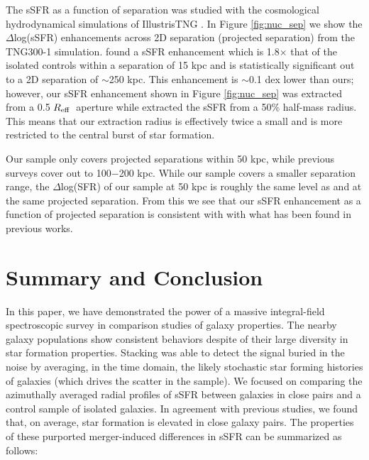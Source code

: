 \documentclass[iop,revtex4,twocolumn,apj,numberedappendix,appendixfloats]{emulateapj}
\newcommand{\reff}{$R_{\rm eff}$}
\begin{document}
The sSFR as a function of separation was studied with the cosmological hydrodynamical simulations of IllustrisTNG \citep{Patton:2020}. In Figure \ref{fig:nuc_sep} we show the $\Delta$log(sSFR) enhancements across 2D separation (projected separation) from the TNG300-1 simulation. \citet{Patton:2020} found a sSFR enhancement which is 1.8$\times$ that of the isolated controls within a separation of 15 kpc and is statistically significant out to a 2D separation of $\sim$250 kpc. This enhancement is $\sim$0.1 dex lower than ours; however, our sSFR enhancement shown in Figure \ref{fig:nuc_sep} was extracted from a 0.5 \reff\ aperture while \citet{Patton:2020} extracted the sSFR from a 50\% half-mass radius. This means that our extraction radius is effectively twice a small and is more restricted to the central burst of star formation. 

Our sample only covers projected separations within 50 kpc, while previous surveys cover out to 100$-$200 kpc. While our sample covers a smaller separation range, the $\Delta$log(SFR) of our sample at 50 kpc is roughly the same level as \citet{Scudder:2012} and \citet{Patton:2013} at the same projected separation. From this we see that our sSFR enhancement as a function of projected separation is consistent with with what has been found in previous works. 

\section{Summary and Conclusion}\label{sec:sum}

In this paper, we have demonstrated the power of a massive integral-field spectroscopic survey in comparison studies of galaxy properties. The nearby galaxy populations show consistent behaviors despite of their large diversity in star formation properties. Stacking was able to detect the signal buried in the noise by averaging, in the time domain, the likely stochastic star forming histories of galaxies (which drives the scatter in the sample). We focused on comparing the azimuthally averaged radial profiles of sSFR between galaxies in close pairs and a control sample of isolated galaxies. In agreement with previous studies, we found that, on average, star formation is elevated in close galaxy pairs. The properties of these purported merger-induced differences in sSFR can be summarized as follows:
\end{document}
